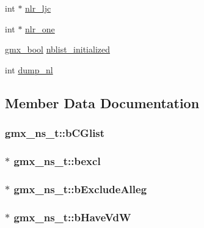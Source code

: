 \begin{DoxyCompactItemize}
\item 
int $\ast$ \hyperlink{structgmx__ns__t_a97fb0786917f86af71b3949ccc7f5a5b}{nlr\-\_\-ljc}
\item 
int $\ast$ \hyperlink{structgmx__ns__t_a93cdefc71c47f0a5da705d967b3cf7ff}{nlr\-\_\-one}
\item 
\hyperlink{include_2types_2simple_8h_a8fddad319f226e856400d190198d5151}{gmx\-\_\-bool} \hyperlink{structgmx__ns__t_af0f615e9613749a05aa8e299c77662f2}{nblist\-\_\-initialized}
\item 
int \hyperlink{structgmx__ns__t_a559e0bba097f8b88ec640f4df5d92462}{dump\-\_\-nl}
\end{DoxyCompactItemize}


\subsection{\-Member \-Data \-Documentation}
\hypertarget{structgmx__ns__t_acfe82ae220e419a621cc7d7029bbe0b4}{
\subsubsection[{b\-C\-Glist}]{ {\bf gmx\-\_\-ns\-\_\-t\-::b\-C\-Glist}}}\label{structgmx__ns__t_acfe82ae220e419a621cc7d7029bbe0b4}
\hypertarget{structgmx__ns__t_aba5a498a3c483d8c11b3a74d18825965}{
\subsubsection[{bexcl}]{ $\ast$ {\bf gmx\-\_\-ns\-\_\-t\-::bexcl}}}\label{structgmx__ns__t_aba5a498a3c483d8c11b3a74d18825965}
\hypertarget{structgmx__ns__t_a13bfade89cde5d9222be7e6250072fd6}{
\subsubsection[{b\-Exclude\-Alleg}]{ $\ast$ {\bf gmx\-\_\-ns\-\_\-t\-::b\-Exclude\-Alleg}}}\label{structgmx__ns__t_a13bfade89cde5d9222be7e6250072fd6}
\hypertarget{structgmx__ns__t_a08c86fd736dc6f8e430d5ba962b0b3db}{
\subsubsection[{b\-Have\-Vd\-W}]{ $\ast$ {\bf gmx\-\_\-ns\-\_\-t\-::b\-Have\-Vd\-W}}}\label{structgmx__ns__t_a08c86fd736dc6f8e430d5ba962b0b3db}
